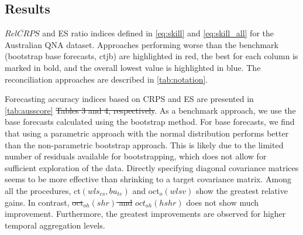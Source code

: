 \documentclass[review, 11pt]{elsarticle}
\theoremstyle{definition}
\begin{document}
\subsection{Results}\label{ssec:ausresults}
\begin{table}[!t]
	\centering
	\begingroup
	\fontsize{9}{11}\selectfont
	
	\endgroup
	\caption{\color{blue}$\overline{RelCRPS}$ and ES ratio indices defined in \eqref{eq:skill} and \eqref{eq:skill_all} for the Australian QNA dataset. Approaches performing worse than the benchmark (bootstrap base forecasts, ctjb) are highlighted in red, the best for each column is marked in bold, and the overall lowest value is highlighted in blue. The reconciliation approaches are described in \autoref{tab:notation}.}
	\label{tab:ausscore}
	\vspace*{-0.5\baselineskip}
\end{table}

Forecasting accuracy indices based on CRPS and ES are presented in {\color{blue}\autoref{tab:ausscore}} {\color{red}\sout{Tables 3 and 4, respectively}}. As a benchmark approach, we use the base forecasts calculated using the bootstrap method. For base forecasts, we find that using a parametric approach with the normal distribution performs better than the non-parametric bootstrap approach. This is likely due to the limited number of residuals available for bootstrapping, which does not allow for sufficient exploration of the data. Directly specifying diagonal covariance matrices seems to be more effective than shrinking to a target covariance matrix. Among all the procedures, ct$(wls_{cs},bu_{te})$ and oct$_o(wlsv)$ show the greatest relative gains. In contrast, {\color{red}\sout{oct$_{oh}(shr)$ and}} $oct_{oh}(hshr)$ do{\color{blue}es} not show much improvement. Furthermore, the greatest improvements are observed for higher temporal aggregation levels.
\end{document}
